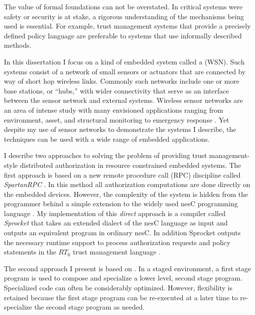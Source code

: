 The value of formal foundations can not be overstated. In critical systems were safety or
security is at stake, a rigorous understanding of the mechanisms being used is essential. For
example, trust management systems that provide a precisely defined policy language are
preferable to systems that use informally described methods.

In this dissertation I focus on a kind of embedded system called a  (WSN). Such systems consist of a network of small sensors or actuators that are
connected by way of short hop wireless links. Commonly such networks include one or more base
stations, or ``hubs,'' with wider connectivity that serve as an interface between the sensor
network and external systems. Wireless sensor networks are an area of intense study with many
envisioned applications ranging from environment, asset, and structural monitoring to emergency
response \cite{Culler:2004:GEI:1018015.1018072,1038146}. Yet despite my use of sensor networks
to demonstrate the systems I describe, the techniques can be used with a wide range of embedded
applications.

I describe two approaches to solving the problem of providing trust management-style distributed
authorization in resource constrained embedded systems. The first approach is based on a new
remote procedure call (RPC) discipline called \textit{SpartanRPC}
\cite{chapin-skalka-SpartanRPC,chapin-skalka-SpartanRPCTR}. In this method all authorization
computations are done directly on the embedded devices. However, the complexity of the system is
hidden from the programmer behind a simple extension to the widely used nesC programming
language \cite{Gay-nesC-2003}. My implementation of this \emph{direct} approach is a compiler
called \textit{Sprocket} that takes an extended dialect of the nesC language as input and
outputs an equivalent program in ordinary nesC. In addition Sprocket outputs the necessary
runtime support to process authorization requests and policy statements in the $RT_0$ trust
management language \cite{Li:DRBTMF,Li:RRBTMF}.

The second approach I present is based on 
\cite{Taha-MetaML,Sheard-TemplateHaskell,Mainland-Flask-2008,FramedML}. In a staged environment,
a first stage program is used to compose and specialize a lower level, second stage program.
Specialized code can often be considerably optimized. However, flexibility is retained because
the first stage program can be re-executed at a later time to re-specialize the second stage
program as needed.

